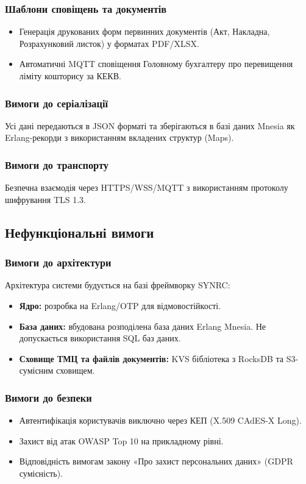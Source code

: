\documentclass{article}
\begin{document}
\subsubsection{Шаблони сповіщень та документів}
\begin{itemize}
    \item Генерація друкованих форм первинних документів (Акт, Накладна, Розрахунковий листок) у форматах PDF/XLSX.
    \item Автоматичні MQTT сповіщення Головному бухгалтеру про перевищення ліміту кошторису за КЕКВ.
\end{itemize}

\subsubsection{Вимоги до серіалізації}
Усі дані передаються в JSON форматі та зберігаються в базі даних Mnesia як Erlang-рекорди з використанням вкладених структур (Maps).

\subsubsection{Вимоги до транспорту}
Безпечна взаємодія через HTTPS/WSS/MQTT з використанням протоколу шифрування TLS 1.3.

\subsection{Нефункціональні вимоги}

\subsubsection{Вимоги до архітектури}
Архітектура системи будується на базі фреймворку SYNRC:
\begin{itemize}
    \item \textbf{Ядро:} розробка на Erlang/OTP для відмовостійкості.
    \item \textbf{База даних:} вбудована розподілена база даних Erlang Mnesia. Не допускається використання SQL баз даних.
    \item \textbf{Сховище ТМЦ та файлів документів:} KVS бібліотека з RocksDB та S3-сумісним сховищем.
\end{itemize}

\subsubsection{Вимоги до безпеки}
\begin{itemize}
    \item Автентифікація користувачів виключно через КЕП (X.509 CAdES-X Long).
    \item Захист від атак OWASP Top 10 на прикладному рівні.
    \item Відповідність вимогам закону «Про захист персональних даних» (GDPR сумісність).
\end{itemize}
\end{document}
